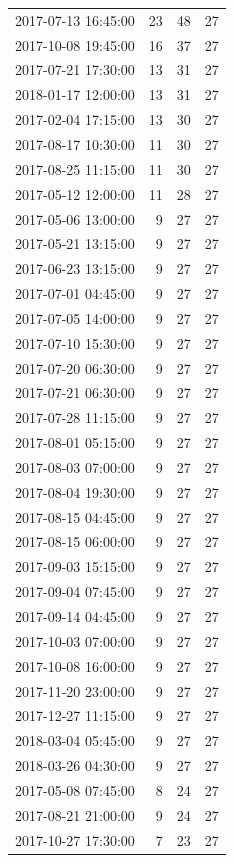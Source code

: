 \begin{tabular}{lrrr}
2017-07-13 16:45:00 & 23 & 48 & 27 \\
2017-10-08 19:45:00 & 16 & 37 & 27 \\
2017-07-21 17:30:00 & 13 & 31 & 27 \\
2018-01-17 12:00:00 & 13 & 31 & 27 \\
2017-02-04 17:15:00 & 13 & 30 & 27 \\
2017-08-17 10:30:00 & 11 & 30 & 27 \\
2017-08-25 11:15:00 & 11 & 30 & 27 \\
2017-05-12 12:00:00 & 11 & 28 & 27 \\
2017-05-06 13:00:00 & 9 & 27 & 27 \\
2017-05-21 13:15:00 & 9 & 27 & 27 \\
2017-06-23 13:15:00 & 9 & 27 & 27 \\
2017-07-01 04:45:00 & 9 & 27 & 27 \\
2017-07-05 14:00:00 & 9 & 27 & 27 \\
2017-07-10 15:30:00 & 9 & 27 & 27 \\
2017-07-20 06:30:00 & 9 & 27 & 27 \\
2017-07-21 06:30:00 & 9 & 27 & 27 \\
2017-07-28 11:15:00 & 9 & 27 & 27 \\
2017-08-01 05:15:00 & 9 & 27 & 27 \\
2017-08-03 07:00:00 & 9 & 27 & 27 \\
2017-08-04 19:30:00 & 9 & 27 & 27 \\
2017-08-15 04:45:00 & 9 & 27 & 27 \\
2017-08-15 06:00:00 & 9 & 27 & 27 \\
2017-09-03 15:15:00 & 9 & 27 & 27 \\
2017-09-04 07:45:00 & 9 & 27 & 27 \\
2017-09-14 04:45:00 & 9 & 27 & 27 \\
2017-10-03 07:00:00 & 9 & 27 & 27 \\
2017-10-08 16:00:00 & 9 & 27 & 27 \\
2017-11-20 23:00:00 & 9 & 27 & 27 \\
2017-12-27 11:15:00 & 9 & 27 & 27 \\
2018-03-04 05:45:00 & 9 & 27 & 27 \\
2018-03-26 04:30:00 & 9 & 27 & 27 \\
2017-05-08 07:45:00 & 8 & 24 & 27 \\
2017-08-21 21:00:00 & 9 & 24 & 27 \\
2017-10-27 17:30:00 & 7 & 23 & 27 \\

\end{tabular}

